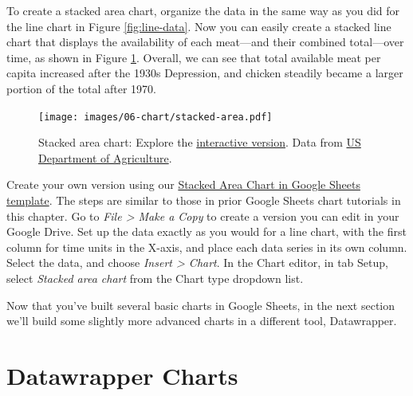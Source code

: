 \documentclass[
  english,
]{book}
\begin{document}
To create a stacked area chart, organize the data in the same way as you did for the line chart in Figure \ref{fig:line-data}. Now you can easily create a stacked line chart that displays the availability of each meat---and their combined total---over time, as shown in Figure \ref{fig:stacked-area}. Overall, we can see that total available meat per capita increased after the 1930s Depression, and chicken steadily became a larger portion of the total after 1970.



\begin{figure}
\centering
\texttt{[image: images/06-chart/stacked-area.pdf]}
\caption{\label{fig:stacked-area}Stacked area chart: Explore the \href{https://docs.google.com/spreadsheets/d/e/2PACX-1vSotrM_zZDo0MT--JgXwA3nBQudzIwmt8TGwmZxvUxNUzPrfBgqso5glLn05ObJxdTTmKoT_fQWQMx-/pubchart?oid=1976471326\&format=interactive}{interactive version}. Data from \href{https://docs.google.com/spreadsheets/d/16QR4prVUoztW6bFVyj_q0n8GjNWqkcW6sgAkIyHQIJc/edit?usp=sharing}{US Department of Agriculture}.}
\end{figure}

Create your own version using our \href{https://docs.google.com/spreadsheets/d/16QR4prVUoztW6bFVyj_q0n8GjNWqkcW6sgAkIyHQIJc/}{Stacked Area Chart in Google Sheets template}. The steps are similar to those in prior Google Sheets chart tutorials in this chapter. Go to \emph{File \textgreater{} Make a Copy} to create a version you can edit in your Google Drive. Set up the data exactly as you would for a line chart, with the first column for time units in the X-axis, and place each data series in its own column. Select the data, and choose \emph{Insert \textgreater{} Chart}. In the Chart editor, in tab Setup, select \emph{Stacked area chart} from the Chart type dropdown list.

Now that you've built several basic charts in Google Sheets, in the next section we'll build some slightly more advanced charts in a different tool, Datawrapper.

\hypertarget{chart-datawrapper}{%
\section*{Datawrapper Charts}\label{chart-datawrapper}}
\end{document}
